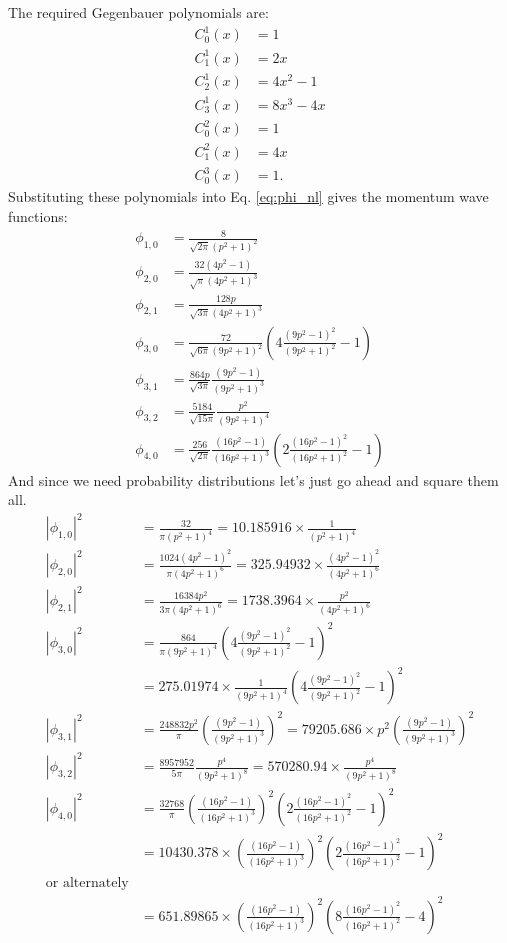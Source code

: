 \documentclass[12pt]{article}
\begin{document}
The required Gegenbauer polynomials are:
\begin{align*}
C^1_0(x)&=1\\
C^1_1(x)&=2x\\
C^1_2(x)&=4x^2-1\\
C^1_3(x)&=8x^3-4x\\
C^2_0(x)&=1\\
C^2_1(x)&=4x\\
C^3_0(x)&=1.
\end{align*}
Substituting these polynomials into Eq. \ref{eq:phi_nl} gives the momentum wave functions:
\begin{align}
\phi_{1,0}&=\frac{8}{\sqrt{2\pi}(p^2+1)^2}\\
\phi_{2,0}&=\frac{32(4p^2-1)}{\sqrt{\pi}(4p^2+1)^3}\\
\phi_{2,1}&=\frac{128p}{\sqrt{3\pi}(4p^2+1)^3}\\
\phi_{3,0}&=\frac{72}{\sqrt{6\pi}(9p^2+1)^2}\left(4\frac{(9p^2-1)^2}{(9p^2+1)^2}-1\right)\\
\phi_{3,1}&=\frac{864p}{\sqrt{3\pi}}\frac{(9p^2-1)}{(9p^2+1)^3}\\
\phi_{3,2}&=\frac{5184}{\sqrt{15\pi}}\frac{p^2}{(9p^2+1)^4}\\
\phi_{4,0}&=\frac{256}{\sqrt{2\pi}}\frac{(16p^2-1)}{(16p^2+1)^3}\left(2\frac{(16p^2-1)^2}{(16p^2+1)^2}-1\right)
\end{align}
And since we need probability distributions let's just go ahead and square them all.
\begin{align}
\left|\phi_{1,0}\right|^2&=\frac{32}{\pi(p^2+1)^4}=10.185916\times\frac{1}{(p^2+1)^4}\\
\left|\phi_{2,0}\right|^2&=\frac{1024(4p^2-1)^2}{\pi(4p^2+1)^6}=325.94932\times\frac{(4p^2-1)^2}{(4p^2+1)^6}\\
\left|\phi_{2,1}\right|^2&=\frac{16384p^2}{3\pi(4p^2+1)^6}=1738.3964\times\frac{p^2}{(4p^2+1)^6}\\
\left|\phi_{3,0}\right|^2&=\frac{864}{\pi(9p^2+1)^4}\left(4\frac{(9p^2-1)^2}{(9p^2+1)^2}-1\right)^2\\~&=275.01974\times\frac{1}{(9p^2+1)^4}\left(4\frac{(9p^2-1)^2}{(9p^2+1)^2}-1\right)^2\\
\left|\phi_{3,1}\right|^2&=\frac{248832p^2}{\pi}\left(\frac{(9p^2-1)}{(9p^2+1)^3}\right)^2=79205.686\times p^2\left(\frac{(9p^2-1)}{(9p^2+1)^3}\right)^2\\
\left|\phi_{3,2}\right|^2&=\frac{8957952}{5\pi}\frac{p^4}{(9p^2+1)^8}=570280.94\times\frac{p^4}{(9p^2+1)^8}\\
\left|\phi_{4,0}\right|^2&=\frac{32768}{\pi}\left(\frac{(16p^2-1)}{(16p^2+1)^3}\right)^2\left(2\frac{(16p^2-1)^2}{(16p^2+1)^2}-1\right)^2\\~&=10430.378\times\left(\frac{(16p^2-1)}{(16p^2+1)^3}\right)^2\left(2\frac{(16p^2-1)^2}{(16p^2+1)^2}-1\right)^2\\\textrm{or alternately}\\
~&=651.89865\times\left(\frac{(16p^2-1)}{(16p^2+1)^3}\right)^2\left(8\frac{(16p^2-1)^2}{(16p^2+1)^2}-4\right)^2
\end{align}
\end{document}
